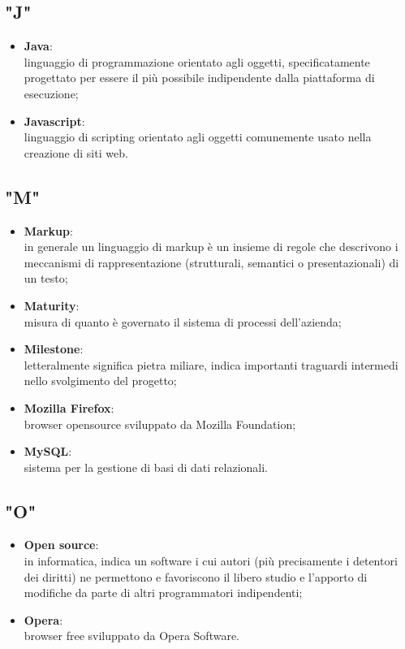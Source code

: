 \subsection{"J"}
\begin{itemize}
\item \textbf{Java}:\\ linguaggio di programmazione orientato agli oggetti, specificatamente progettato per essere il più possibile indipendente dalla piattaforma di esecuzione;
\item \textbf{Javascript}:\\ linguaggio di scripting orientato agli oggetti comunemente usato nella creazione di siti web.
\end{itemize}

\subsection{"M"}
\begin{itemize}
\item \textbf{Markup}:\\ in generale un linguaggio di markup è un insieme di regole che descrivono i meccanismi di rappresentazione (strutturali, semantici o presentazionali) di un testo;
\item \textbf{Maturity}:\\ misura di quanto è governato il sistema di processi dell'azienda;
\item \textbf{Milestone}:\\ letteralmente significa pietra miliare, indica importanti traguardi intermedi nello svolgimento del progetto;
\item \textbf{Mozilla Firefox}:\\ browser opensource sviluppato da Mozilla Foundation;
\item \textbf{MySQL}:\\ sistema per la gestione di basi di dati relazionali.
\end{itemize}

\subsection{"O"}
\begin{itemize}
\item \textbf{Open source}:\\ in informatica, indica un software i cui autori (più precisamente i detentori dei diritti) ne permettono e favoriscono il libero studio e l'apporto di modifiche da parte di altri programmatori indipendenti;
\item \textbf{Opera}:\\ browser free sviluppato da Opera Software.
\end{itemize}

